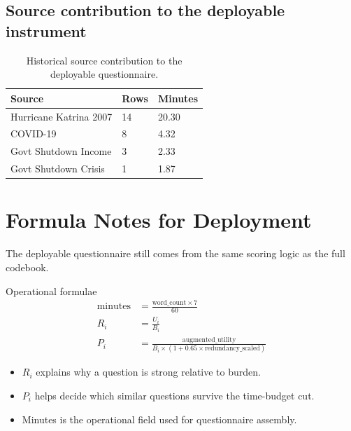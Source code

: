 \documentclass[12pt]{article}
\begin{document}
\subsection{Source contribution to the deployable instrument}

\begin{table}[H]
\centering
\begin{tabularx}{0.64\textwidth}{L{0.34\textwidth} R{0.10\textwidth} R{0.10\textwidth}}
\toprule
Source & Rows & Minutes \\
\midrule
Hurricane Katrina 2007 & 14 & 20.30 \\
COVID-19 & 8 & 4.32 \\
Govt Shutdown Income & 3 & 2.33 \\
Govt Shutdown Crisis & 1 & 1.87 \\
\bottomrule
\end{tabularx}
\caption{Historical source contribution to the deployable questionnaire.}
\end{table}

\section{Formula Notes for Deployment}

The deployable questionnaire still comes from the same scoring logic as the full codebook.

\begin{psidbox}{Operational formulae}
\begin{align*}
\text{minutes} &= \frac{\text{word\_count} \times 7}{60} \\
R_i &= \frac{U_i}{B_i} \\
P_i &= \frac{\text{augmented\_utility}}{B_i \times (1 + 0.65 \times \text{redundancy\_scaled})}
\end{align*}

\begin{itemize}
\item $R_i$ explains why a question is strong relative to burden.
\item $P_i$ helps decide which similar questions survive the time-budget cut.
\item Minutes is the operational field used for questionnaire assembly.
\end{itemize}
\end{psidbox}
\end{document}
